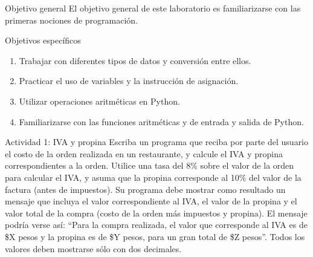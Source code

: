 \documentclass{ip-lab}
\begin{document}
\maketitle

\begin{sectionbox}{Objetivo general}
El objetivo general de este laboratorio es familiarizarse con las primeras nociones de programación.
\end{sectionbox}

\begin{sectionbox}{Objetivos específicos}
\begin{enumerate}
    \item Trabajar con diferentes tipos de datos y conversión entre ellos.
    \item Practicar el uso de variables y la instrucción de asignación.
    \item Utilizar operaciones aritméticas en Python.
    \item Familiarizarse con las funciones aritméticas y de entrada y salida de Python.
\end{enumerate}
\end{sectionbox}

\begin{sectionbox}{Actividad 1: IVA y propina}
Escriba un programa que reciba por parte del usuario el costo de la orden realizada en un restaurante, y calcule el IVA y propina correspondientes a la orden. Utilice una tasa del 8\% sobre el valor de la orden para calcular el IVA, y asuma que la propina corresponde al 10\% del valor de la factura (antes de impuestos). Su programa debe mostrar como resultado un mensaje que incluya el valor correspondiente al IVA, el valor de la propina y el valor total de la compra (costo de la orden más impuestos y propina). El mensaje podría verse así: ``Para la compra realizada, el valor que corresponde al IVA es de \$X pesos y la propina es de \$Y pesos, para un gran total de \$Z pesos''. Todos los valores deben mostrarse sólo con dos decimales.
\end{sectionbox}
\end{document}

